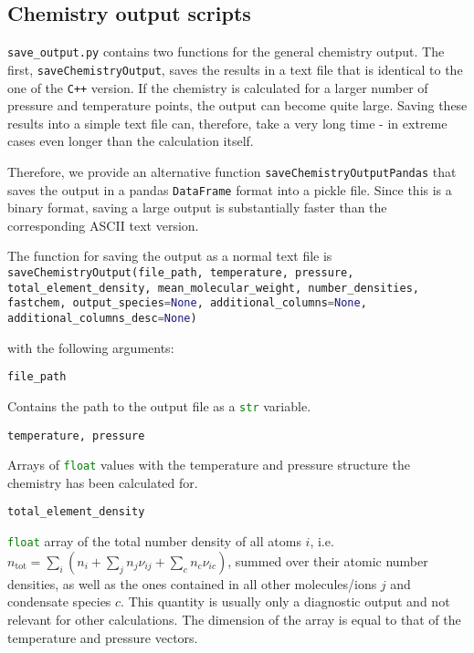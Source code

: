 \documentclass[numbers=noenddot]{aux/fcmanual}
\newcommand{\cpp}{\ttt{C++}\xspace}
\newcommand{\ttt}[1]{\texttt {#1}}
\begin{document}
\subsection{Chemistry output scripts}

\texttt{save\_output.py} contains two functions for the general chemistry output. The first, \lstinline[language=Python]!saveChemistryOutput!, saves the results in a text file that is identical to the one of the \cpp version. If the chemistry is calculated for a larger number of pressure and temperature points, the output can become quite large. Saving these results into a simple text file can, therefore, take a very long time - in extreme cases even longer than the calculation itself.

Therefore, we provide an alternative function \lstinline[language=Python]!saveChemistryOutputPandas! that saves the output in a pandas \lstinline[language=Python]!DataFrame! format into a pickle file. Since this is a binary format, saving a large output is substantially faster than the corresponding ASCII text version.

The function for saving the output as a normal text file is\\

\lstinline[language=Python, breaklines, breakatwhitespace]!saveChemistryOutput(file_path, temperature, pressure, total_element_density, mean_molecular_weight, number_densities, fastchem, output_species=None, additional_columns=None, additional_columns_desc=None)!

\bigbreak

with the following arguments:

\bigbreak

\lstinline[language=Python]!file_path!
\begin{addmargin}[25pt]{0pt}
	Contains the path to the output file as a \lstinline[language=Python]!str! variable.
\end{addmargin}


\bigbreak

\lstinline[language=Python]!temperature, pressure!
\begin{addmargin}[25pt]{0pt}
	Arrays of \lstinline[language=Python]!float! values with the temperature and pressure structure the chemistry has been calculated for.
\end{addmargin}

\bigbreak

\lstinline[language=Python]!total_element_density!
\begin{addmargin}[25pt]{0pt}
	\lstinline[language=Python]!float! array of the total number density of all atoms $i$, i.e. $n_\mathrm{tot} = \sum_i \left( n_i + \sum_j n_j \nu_{ij} + \sum_c n_c \nu_{ic}\right)$, summed over their atomic number densities, as well as the ones contained in all other molecules/ions $j$ and condensate species $c$. This quantity is usually only a diagnostic output and not relevant for other calculations. The dimension of the array is equal to that of the temperature and pressure vectors.
\end{addmargin}
\end{document}
